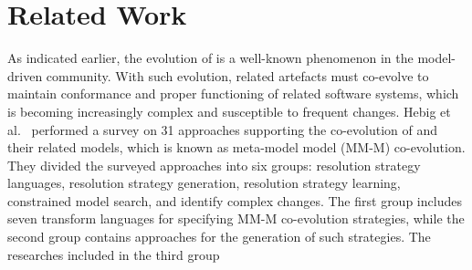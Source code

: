 \section{Related Work} \label{sec:RW}

As indicated earlier, the evolution of \metamodels is a well-known phenomenon in the model-driven community. With such evolution, related artefacts must co-evolve to maintain conformance and proper functioning of related software systems, which is becoming increasingly complex and susceptible to frequent changes. Hebig et al.~\autocite{Hebig2017} performed a survey on 31 approaches supporting the co-evolution of \metamodels and their related models, which is known as meta-model model (MM-M) co-evolution. They divided the surveyed approaches into six groups: resolution strategy languages, resolution strategy generation, resolution strategy learning, constrained model search, and identify complex changes. The first group includes seven transform languages for specifying MM-M co-evolution strategies, while the second group contains approaches for the generation of such strategies. The researches included in the third group 



